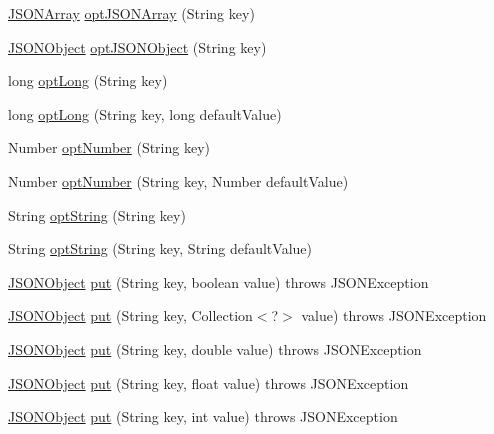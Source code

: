 \begin{DoxyCompactItemize}
\item 
\hyperlink{classorg_1_1json_1_1JSONArray}{J\-S\-O\-N\-Array} \hyperlink{classorg_1_1json_1_1JSONObject_a1e0dce653705a1df438636fbb4fe94e2}{opt\-J\-S\-O\-N\-Array} (String key)
\item 
\hyperlink{classorg_1_1json_1_1JSONObject}{J\-S\-O\-N\-Object} \hyperlink{classorg_1_1json_1_1JSONObject_aa1024c804613178b09532ef7549e7b2b}{opt\-J\-S\-O\-N\-Object} (String key)
\item 
long \hyperlink{classorg_1_1json_1_1JSONObject_af37dbbf760c1833402c986a62c4baef8}{opt\-Long} (String key)
\item 
long \hyperlink{classorg_1_1json_1_1JSONObject_aa826ad7537ebfac8adda13f53ee0008b}{opt\-Long} (String key, long default\-Value)
\item 
Number \hyperlink{classorg_1_1json_1_1JSONObject_a1c71caf892b19475f16140b917ba47d0}{opt\-Number} (String key)
\item 
Number \hyperlink{classorg_1_1json_1_1JSONObject_a7cbdf3b15e0a5a7925739e216bf90e3d}{opt\-Number} (String key, Number default\-Value)
\item 
String \hyperlink{classorg_1_1json_1_1JSONObject_afee65e7bb15356d0fa9006ef391449e0}{opt\-String} (String key)
\item 
String \hyperlink{classorg_1_1json_1_1JSONObject_a6501a2a9b5a97560d74337c082a32732}{opt\-String} (String key, String default\-Value)
\item 
\hyperlink{classorg_1_1json_1_1JSONObject}{J\-S\-O\-N\-Object} \hyperlink{classorg_1_1json_1_1JSONObject_a92b8b4edda8b4805abca24f5b689748b}{put} (String key, boolean value)  throws J\-S\-O\-N\-Exception 
\item 
\hyperlink{classorg_1_1json_1_1JSONObject}{J\-S\-O\-N\-Object} \hyperlink{classorg_1_1json_1_1JSONObject_ae1461f04b8ba9133aaf689e1ef192295}{put} (String key, Collection$<$?$>$ value)  throws J\-S\-O\-N\-Exception 
\item 
\hyperlink{classorg_1_1json_1_1JSONObject}{J\-S\-O\-N\-Object} \hyperlink{classorg_1_1json_1_1JSONObject_a669cae1e6dd7bcab4a55d4a7078a0e72}{put} (String key, double value)  throws J\-S\-O\-N\-Exception 
\item 
\hyperlink{classorg_1_1json_1_1JSONObject}{J\-S\-O\-N\-Object} \hyperlink{classorg_1_1json_1_1JSONObject_a420cbb510cef3161d54f59801279cda0}{put} (String key, float value)  throws J\-S\-O\-N\-Exception 
\item 
\hyperlink{classorg_1_1json_1_1JSONObject}{J\-S\-O\-N\-Object} \hyperlink{classorg_1_1json_1_1JSONObject_a36a08204331752dffedc6e9d1b6aa297}{put} (String key, int value)  throws J\-S\-O\-N\-Exception 

\end{DoxyCompactItemize}
